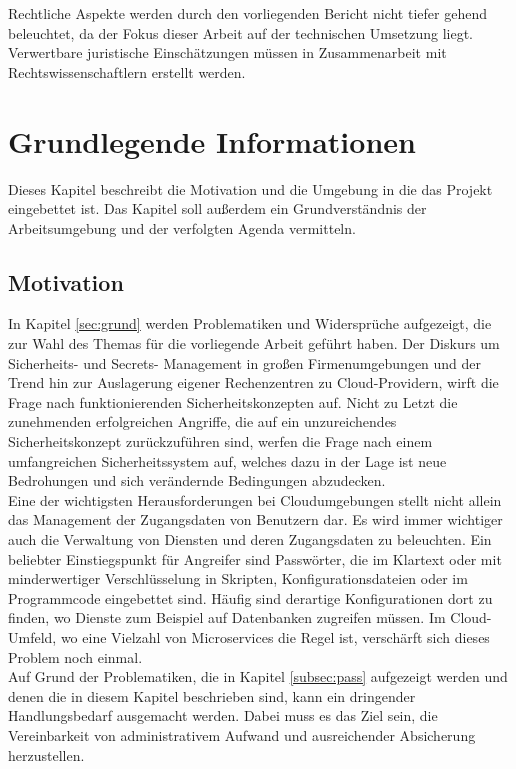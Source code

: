 \documentclass[
book,
a4paper,   
titlepage,  
halfparskip,
12pt        
]{scrartcl}
\begin{document}
\begin{onehalfspacing}
Rechtliche Aspekte werden durch den vorliegenden Bericht nicht tiefer gehend beleuchtet, da der Fokus dieser Arbeit auf der technischen Umsetzung liegt. Verwertbare juristische Einschätzungen müssen in Zusammenarbeit mit Rechtswissenschaftlern erstellt werden.

\newpage
\section{Grundlegende Informationen}
\label{sec:inf}
Dieses Kapitel beschreibt die Motivation und die Umgebung in die das Projekt eingebettet ist. Das Kapitel soll außerdem ein Grundverständnis der Arbeitsumgebung und der verfolgten Agenda vermitteln.

\subsection{Motivation}
In Kapitel \vref{sec:grund} werden Problematiken und Widersprüche aufgezeigt, die zur Wahl des Themas für die vorliegende Arbeit geführt haben. Der Diskurs um Sicherheits- und Secrets- Management in großen Firmenumgebungen und der Trend hin zur Auslagerung eigener Rechenzentren zu Cloud-Providern, wirft die Frage nach funktionierenden Sicherheitskonzepten auf. Nicht zu Letzt die zunehmenden erfolgreichen Angriffe, die auf ein unzureichendes Sicherheitskonzept zurückzuführen sind, werfen die Frage nach einem umfangreichen Sicherheitssystem auf, welches dazu in der Lage ist neue Bedrohungen und sich verändernde Bedingungen abzudecken.\\
Eine der wichtigsten Herausforderungen bei Cloudumgebungen stellt nicht allein das Management der Zugangsdaten von Benutzern dar. Es wird immer wichtiger auch die Verwaltung von Diensten und deren Zugangsdaten zu beleuchten. Ein beliebter Einstiegspunkt für Angreifer sind Passwörter, die im Klartext oder mit minderwertiger Verschlüsselung in Skripten, Konfigurationsdateien oder im Programmcode eingebettet sind. Häufig sind derartige Konfigurationen dort zu finden, wo Dienste zum Beispiel auf Datenbanken zugreifen müssen. Im Cloud-Umfeld, wo eine Vielzahl von Microservices die Regel ist, verschärft sich dieses Problem noch einmal.\\
Auf Grund der Problematiken, die in Kapitel \vref{subsec:pass} aufgezeigt werden und denen die in diesem Kapitel beschrieben sind, kann ein dringender Handlungsbedarf ausgemacht werden. Dabei muss es das Ziel sein, die Vereinbarkeit von administrativem Aufwand und ausreichender Absicherung herzustellen. 


\end{onehalfspacing}
\end{document}
